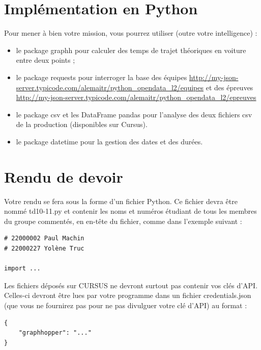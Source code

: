 \documentclass[11pt,a4paper]{article}
\begin{document}
\section{Implémentation en Python}


Pour mener à bien votre mission, vous pourrez utiliser (outre votre intelligence) :
\begin{itemize}
\item le package graphh pour calculer des temps de trajet théoriques en voiture entre deux points ;
\item le package requests pour interroger la base des équipes \url{http://my-json-server.typicode.com/alemaitr/python_opendata_l2/equipes} et des épreuves \url{http://my-json-server.typicode.com/alemaitr/python_opendata_l2/epreuves}
\item le package csv et les DataFrame pandas pour l'analyse des deux fichiers csv de la production (disponibles sur Cursus). 
\item le package datetime pour la gestion des dates et des durées.
\end{itemize}



\section{Rendu de devoir}
Votre rendu se fera sous la forme d’un
fichier Python. Ce fichier devra être nommé td10-11.py et contenir les noms et numéros étudiant de tous
les membres du groupe commentés, en en-tête du fichier, comme dans l’exemple suivant :
\begin{verbatim}
# 22000002 Paul Machin
# 22000227 Yolène Truc

import ...
\end{verbatim}
Les fichiers déposés sur CURSUS ne devront surtout pas contenir vos clés d’API. Celles-ci devront être lues par votre programme dans un fichier credentials.json (que vous ne fournirez pas pour ne pas divulguer votre clé d’API) au format :
\begin{verbatim}
{
    "graphhopper": "..."
}
\end{verbatim}
\end{document}
